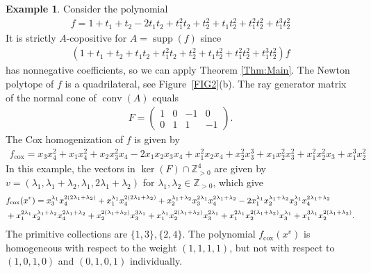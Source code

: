 \documentclass[a4paper,11pt]{amsart}
\theoremstyle{definition}
\newtheorem{example}[theorem]{Example}
\DeclareMathOperator{\conv}{conv}
\DeclareMathOperator{\supp}{supp}
\newcommand{\ZZ}{\mathbb{Z}}
\newcommand{\cox}{\mathrm{cox}}
\begin{document}
\begin{example}
\label{ex:counterex2}
    Consider the polynomial \begin{align*}
f= 1 + t_1 + t_2 -2t_1t_2  +t_1^2t_2  +t_2^2  +t_1t_2^2 +t_1^2t_2^2 + t_1^3t_2^2
    \end{align*}
 It is strictly $A$-copositive for $A = \supp(f)$ since \begin{align*}
(1 + t_1 + t_2 + t_1t_2  +t_1^2t_2  +t_2^2  +t_1t_2^2 +t_1^2t_2^2 + t_1^3t_2^2)f 
    \end{align*}
 has nonnegative coefficients, so we can apply Theorem \ref{Thm:Main}. The Newton polytope of $f$ is a quadrilateral, see Figure~\ref{FIG2}(b). 
The ray generator matrix of the normal cone of $\conv(A)$ equals
\begin{align}
    F = \begin{pmatrix}
        1 & 0 & -1 & 0 \\
        0 & 1 &  1 & -1
    \end{pmatrix}.
\end{align}
The Cox homogenization of $f$ is given by
\begin{align*}
f_\cox= x_3 x_4^2 + x_1x_4^2 + x_2x_3^2 x_4  - 2 x_1x_2x_3x_4  + x_1^2 x_2x_4 + x_2^2 x_3^3 + x_1 x_2^2 x_3^2 + x_1^2 x_2^2 x_3 +x_1^3 x_2^2
\end{align*}
In this example, the vectors in $\ker(F)\cap \ZZ^4_{>0}$ are given by $v=(\lambda_1, \lambda_1 + \lambda_2 ,\lambda_1 ,2\lambda_1 + \lambda_2)$ for $\lambda_1,\lambda_2 \in \ZZ_{>0}$, which give 
\begin{equation}
\small
\begin{aligned}
\label{eq:examplefcoxno-2trick}
&f_\cox(x^v)= x_3^{\lambda_1} x_4^{2(2\lambda_1+\lambda_2)} + x_1^{\lambda_1}x_4^{2(2\lambda_1 + \lambda_2)} + x_2^{\lambda_1 + \lambda_2} x_3^{2\lambda_1 } x_4^{2\lambda_1 + \lambda_2}  - 2 x_1^{\lambda_1}x_2^{\lambda_1 + \lambda_2}x_3^{\lambda_1}x_4^{2\lambda_1 + \lambda_2} \\ & + x_1^{2\lambda_1} x_2^{\lambda_1+\lambda_2} x_4^{2\lambda_1 + \lambda_2} + x_2^{2(\lambda_1 + \lambda_2)} x_3^{3\lambda_1} + x_1^{\lambda_1} x_2^{2(\lambda_1 + \lambda_2)} x_3^{2\lambda_1} + x_1^{2\lambda_1} x_2^{2(\lambda_1+\lambda_2)} x_3^{\lambda_1} +x_1^{3\lambda_1} x_2^{2(\lambda_1 + \lambda_2)}.
\end{aligned}
\end{equation}
The primitive collections are $\{1,3\},\{2,4\}$.
The polynomial $f_\cox(x^v)$ is homogeneous with respect to the weight $(1,1,1,1)$, but not with respect to $(1,0,1,0)$ and $(0,1,0,1)$ individually.

\end{example}
\end{document}
